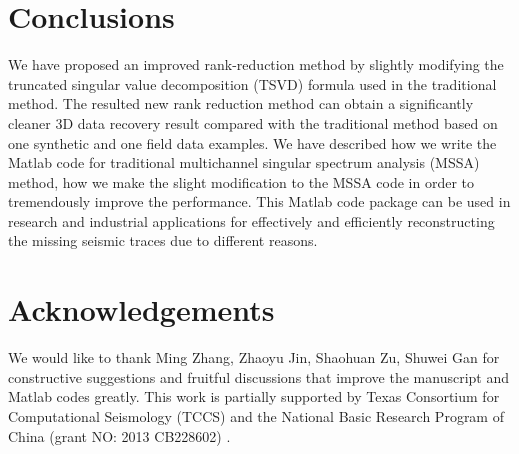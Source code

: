 

\section{Conclusions}
We have proposed an improved rank-reduction method by slightly modifying the truncated singular value decomposition (TSVD) formula used in the traditional method. The resulted new rank reduction method can obtain a significantly cleaner 3D data recovery result compared with the traditional method based on one synthetic and one field data examples. We have described how we write the Matlab code for traditional multichannel singular spectrum analysis (MSSA) method, how we make the slight modification to the MSSA code in order to tremendously improve the performance. This Matlab code package can be used in research and industrial applications for effectively and efficiently reconstructing the missing seismic traces due to different reasons. 

\section{Acknowledgements}
We would like to thank Ming Zhang, Zhaoyu Jin, Shaohuan Zu, Shuwei Gan for constructive suggestions and fruitful discussions that improve the manuscript and Matlab codes greatly. This work is partially supported by Texas Consortium for Computational Seismology (TCCS) and the National Basic Research Program of China (grant NO: 2013 CB228602) .




